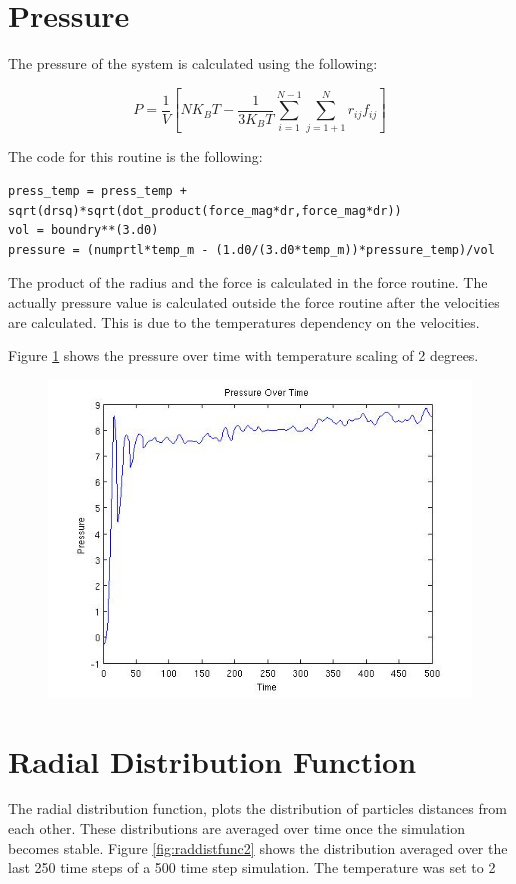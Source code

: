 \documentclass[10pt,a4paper]{article}
\begin{document}
\section{Pressure}
The pressure of the system is calculated using the following:

$$ P=\frac{1}{V}[NK_BT - \frac{1}{3K_BT}\sum_{i=1}^{N-1}\sum_{j=1+1}^{N}r_{ij}f_{ij} ]  $$

The code for this routine is the following:

\begin{lstlisting}
press_temp = press_temp + sqrt(drsq)*sqrt(dot_product(force_mag*dr,force_mag*dr))
vol = boundry**(3.d0)
pressure = (numprtl*temp_m - (1.d0/(3.d0*temp_m))*pressure_temp)/vol
\end{lstlisting}

The product of the radius and the force is calculated in the force routine. The actually pressure value is calculated outside the force routine after the velocities are calculated. This is due to the temperatures dependency on the velocities. 

Figure \ref{fig:oressyre2scale} shows the pressure over time with temperature scaling of 2 degrees.  

\begin{figure}
	\centering
	\includegraphics[width=0.8\linewidth]{pressure2scale}
	\caption[Pressure of the system ]{}
	\label{fig:oressyre2scale}
\end{figure}

\section{Radial Distribution Function}

The radial distribution function, plots the distribution of particles distances from each other. These distributions are averaged over time once the simulation becomes stable. Figure \ref{fig:raddistfunc2} shows the distribution averaged over the last 250 time steps of a 500 time step simulation. The temperature was set to 2 
\end{document}
